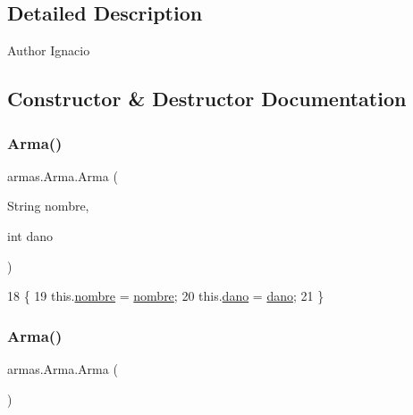 \subsection{Detailed Description}
\begin{DoxyAuthor}{Author}
Ignacio 
\end{DoxyAuthor}


\subsection{Constructor \& Destructor Documentation}
\mbox{\label{classarmas_1_1_arma_a3852166b343463cb023f4a70c490c1a0}} 
\subsubsection{\texorpdfstring{Arma()}{Arma()}\hspace{0.1cm}{\footnotesize\ttfamily [1/2]}}
{\footnotesize\ttfamily armas.\+Arma.\+Arma (\begin{DoxyParamCaption}\item[{String}]{nombre,  }\item[{int}]{dano }\end{DoxyParamCaption})\hspace{0.3cm}{\ttfamily [inline]}}


\begin{DoxyCode}
18     \{
19         this.\mbox{\hyperlink{classarmas_1_1_arma_abdd717c561a99a3436dbfda8129b5581}{nombre}} = \mbox{\hyperlink{classarmas_1_1_arma_abdd717c561a99a3436dbfda8129b5581}{nombre}};
20         this.\mbox{\hyperlink{classarmas_1_1_arma_a59396ee4b222360f19c8be08eb7d137b}{dano}} = \mbox{\hyperlink{classarmas_1_1_arma_a59396ee4b222360f19c8be08eb7d137b}{dano}};
21     \}
\end{DoxyCode}
\mbox{\label{classarmas_1_1_arma_a50ea4ebdc959c0de035d951382e84245}} 
\subsubsection{\texorpdfstring{Arma()}{Arma()}\hspace{0.1cm}{\footnotesize\ttfamily [2/2]}}
{\footnotesize\ttfamily armas.\+Arma.\+Arma (\begin{DoxyParamCaption}{ }\end{DoxyParamCaption})\hspace{0.3cm}{\ttfamily [inline]}}


